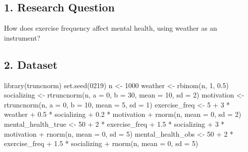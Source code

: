 \documentclass[
  letterpaper,
  DIV=11,
  numbers=noendperiod]{scrartcl}
\newenvironment{Shaded}{\begin{snugshade}}{\end{snugshade}}
\newcommand{\AttributeTok}[1]{\textcolor[rgb]{0.40,0.45,0.13}{#1}}
\newcommand{\DecValTok}[1]{\textcolor[rgb]{0.68,0.00,0.00}{#1}}
\newcommand{\FloatTok}[1]{\textcolor[rgb]{0.68,0.00,0.00}{#1}}
\newcommand{\FunctionTok}[1]{\textcolor[rgb]{0.28,0.35,0.67}{#1}}
\newcommand{\NormalTok}[1]{\textcolor[rgb]{0.00,0.23,0.31}{#1}}
\newcommand{\OtherTok}[1]{\textcolor[rgb]{0.00,0.23,0.31}{#1}}
\newcommand{\SpecialCharTok}[1]{\textcolor[rgb]{0.37,0.37,0.37}{#1}}
\begin{document}
\subsection{1. Research Question}\label{research-question-1}

How does exercise frequency affect mental health, using weather as an
instrument?

\subsection{2. Dataset}\label{dataset}

\begin{Shaded}
\begin{Highlighting}[]
\FunctionTok{library}\NormalTok{(truncnorm)}
\FunctionTok{set.seed}\NormalTok{(}\DecValTok{0219}\NormalTok{)}
\NormalTok{n }\OtherTok{\textless{}{-}} \DecValTok{1000}
\NormalTok{weather }\OtherTok{\textless{}{-}} \FunctionTok{rbinom}\NormalTok{(n, }\DecValTok{1}\NormalTok{, }\FloatTok{0.5}\NormalTok{)}
\NormalTok{socializing }\OtherTok{\textless{}{-}} \FunctionTok{rtruncnorm}\NormalTok{(n, }\AttributeTok{a =} \DecValTok{0}\NormalTok{, }\AttributeTok{b =} \DecValTok{30}\NormalTok{, }\AttributeTok{mean =} \DecValTok{10}\NormalTok{, }\AttributeTok{sd =} \DecValTok{2}\NormalTok{)}
\NormalTok{motivation }\OtherTok{\textless{}{-}} \FunctionTok{rtruncnorm}\NormalTok{(n, }\AttributeTok{a =} \DecValTok{0}\NormalTok{, }\AttributeTok{b =} \DecValTok{10}\NormalTok{, }\AttributeTok{mean =} \DecValTok{5}\NormalTok{, }\AttributeTok{sd =} \DecValTok{1}\NormalTok{)}
\NormalTok{exercise\_freq }\OtherTok{\textless{}{-}} \DecValTok{5} \SpecialCharTok{+} \DecValTok{3} \SpecialCharTok{*}\NormalTok{ weather }\SpecialCharTok{+} \FloatTok{0.5} \SpecialCharTok{*}\NormalTok{ socializing }\SpecialCharTok{+} \FloatTok{0.2} \SpecialCharTok{*}\NormalTok{ motivation }\SpecialCharTok{+} \FunctionTok{rnorm}\NormalTok{(n, }\AttributeTok{mean =} \DecValTok{0}\NormalTok{, }\AttributeTok{sd =} \DecValTok{2}\NormalTok{)}
\NormalTok{mental\_health\_true }\OtherTok{\textless{}{-}} \DecValTok{50} \SpecialCharTok{+} \DecValTok{2} \SpecialCharTok{*}\NormalTok{ exercise\_freq }\SpecialCharTok{+} \FloatTok{1.5} \SpecialCharTok{*}\NormalTok{ socializing }\SpecialCharTok{+} \DecValTok{3} \SpecialCharTok{*}\NormalTok{ motivation }\SpecialCharTok{+} \FunctionTok{rnorm}\NormalTok{(n, }\AttributeTok{mean =} \DecValTok{0}\NormalTok{, }\AttributeTok{sd =} \DecValTok{5}\NormalTok{)}
\NormalTok{mental\_health\_obs }\OtherTok{\textless{}{-}} \DecValTok{50} \SpecialCharTok{+} \DecValTok{2} \SpecialCharTok{*}\NormalTok{ exercise\_freq }\SpecialCharTok{+} \FloatTok{1.5} \SpecialCharTok{*}\NormalTok{ socializing }\SpecialCharTok{+} \FunctionTok{rnorm}\NormalTok{(n, }\AttributeTok{mean =} \DecValTok{0}\NormalTok{, }\AttributeTok{sd =} \DecValTok{5}\NormalTok{)}

\end{Highlighting}
\end{Shaded}
\end{document}
